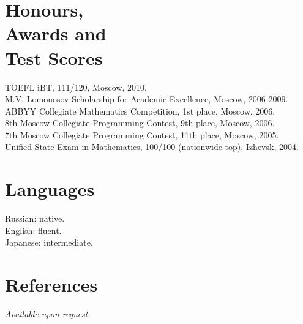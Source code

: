 \documentclass[margin,line]{CV}
\begin{document}
\begin{resume}
    \section{\mysidestyle Honours, \\Awards and \\Test Scores}
    TOEFL iBT, 111/120, Moscow, 2010.                                                               \vspace{1mm}\\
    M.V. Lomonosov Scholarship for Academic Excellence, Moscow, 2006-2009.                          \vspace{1mm}\\
    ABBYY Collegiate Mathematics Competition, 1st place, Moscow, 2006.                              \vspace{1mm}\\
    8th Moscow Collegiate Programming Contest, 9th place, Moscow, 2006.                             \vspace{1mm}\\
    7th Moscow Collegiate Programming Contest, 11th place, Moscow, 2005.                            \vspace{1mm}\\
    Unified State Exam in Mathematics, 100/100 (nationwide top), Izhevsk, 2004.                     \vspace{1mm}


    \section{\mysidestyle Languages}
    Russian: native. \\
    English: fluent. \\
    Japanese: intermediate.

    \section{\mysidestyle References}
    {\sl Available upon request.}

\end{resume}
\end{document}
